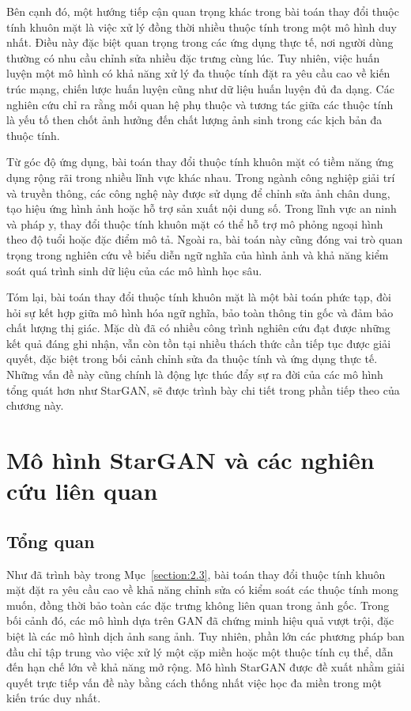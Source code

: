 \documentclass[../DoAn.tex]{subfiles}
\begin{document}
Bên cạnh đó, một hướng tiếp cận quan trọng khác trong bài toán thay đổi thuộc tính khuôn mặt là việc xử lý đồng thời nhiều thuộc tính trong một mô hình duy nhất. Điều này đặc biệt quan trọng trong các ứng dụng thực tế, nơi người dùng thường có nhu cầu chỉnh sửa nhiều đặc trưng cùng lúc. Tuy nhiên, việc huấn luyện một mô hình có khả năng xử lý đa thuộc tính đặt ra yêu cầu cao về kiến trúc mạng, chiến lược huấn luyện cũng như dữ liệu huấn luyện đủ đa dạng. Các nghiên cứu chỉ ra rằng mối quan hệ phụ thuộc và tương tác giữa các thuộc tính là yếu tố then chốt ảnh hưởng đến chất lượng ảnh sinh trong các kịch bản đa thuộc tính.

Từ góc độ ứng dụng, bài toán thay đổi thuộc tính khuôn mặt có tiềm năng ứng dụng rộng rãi trong nhiều lĩnh vực khác nhau. Trong ngành công nghiệp giải trí và truyền thông, các công nghệ này được sử dụng để chỉnh sửa ảnh chân dung, tạo hiệu ứng hình ảnh hoặc hỗ trợ sản xuất nội dung số. Trong lĩnh vực an ninh và pháp y, thay đổi thuộc tính khuôn mặt có thể hỗ trợ mô phỏng ngoại hình theo độ tuổi hoặc đặc điểm mô tả. Ngoài ra, bài toán này cũng đóng vai trò quan trọng trong nghiên cứu về biểu diễn ngữ nghĩa của hình ảnh và khả năng kiểm soát quá trình sinh dữ liệu của các mô hình học sâu.

Tóm lại, bài toán thay đổi thuộc tính khuôn mặt là một bài toán phức tạp, đòi hỏi sự kết hợp giữa mô hình hóa ngữ nghĩa, bảo toàn thông tin gốc và đảm bảo chất lượng thị giác. Mặc dù đã có nhiều công trình nghiên cứu đạt được những kết quả đáng ghi nhận, vẫn còn tồn tại nhiều thách thức cần tiếp tục được giải quyết, đặc biệt trong bối cảnh chỉnh sửa đa thuộc tính và ứng dụng thực tế. Những vấn đề này cũng chính là động lực thúc đẩy sự ra đời của các mô hình tổng quát hơn như StarGAN, sẽ được trình bày chi tiết trong phần tiếp theo của chương này.








\section{Mô hình StarGAN và các nghiên cứu liên quan}
\label{section:2.4}

\subsection{Tổng quan}

Như đã trình bày trong Mục~\ref{section:2.3}, bài toán thay đổi thuộc tính khuôn mặt đặt ra yêu cầu cao về khả năng chỉnh sửa có kiểm soát các thuộc tính mong muốn, đồng thời bảo toàn các đặc trưng không liên quan trong ảnh gốc. Trong bối cảnh đó, các mô hình dựa trên GAN đã chứng minh hiệu quả vượt trội, đặc biệt là các mô hình dịch ảnh sang ảnh. Tuy nhiên, phần lớn các phương pháp ban đầu chỉ tập trung vào việc xử lý một cặp miền hoặc một thuộc tính cụ thể, dẫn đến hạn chế lớn về khả năng mở rộng. Mô hình StarGAN được đề xuất nhằm giải quyết trực tiếp vấn đề này bằng cách thống nhất việc học đa miền trong một kiến trúc duy nhất.
\end{document}
